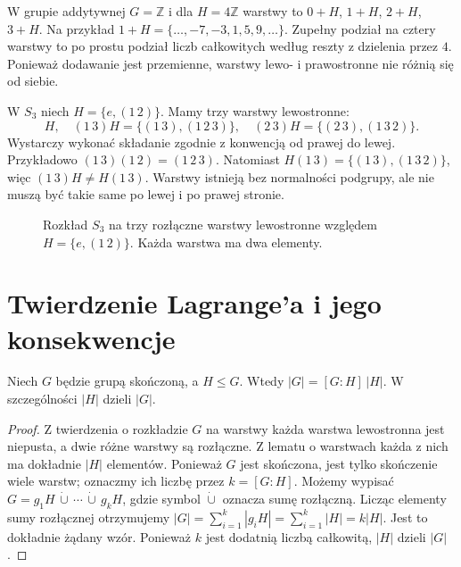 \begin{przyklad}
W grupie addytywnej $G=\mathbb Z$ i dla $H=4\mathbb Z$
warstwy to $0+H$, $1+H$, $2+H$, $3+H$.
Na przykład $1+H=\{\ldots,-7,-3,1,5,9,\ldots\}$.
Zupełny podział na cztery warstwy to po prostu podział liczb
całkowitych według reszty z dzielenia przez $4$.
Ponieważ dodawanie jest przemienne, warstwy lewo- i prawostronne
nie różnią się od siebie.
\end{przyklad}

\begin{przyklad}
\label{aa:prz:warstwy-s3}
W $S_3$ niech $H=\{e,(1\,2)\}$. Mamy trzy warstwy lewostronne:
\[
 H,\quad (1\,3)H=\{(1\,3),(1\,2\,3)\},\quad
 (2\,3)H=\{(2\,3),(1\,3\,2)\}.
\]
Wystarczy wykonać składanie zgodnie z konwencją od prawej do lewej.
Przykładowo $(1\,3)(1\,2)=(1\,2\,3)$.
Natomiast $H(1\,3)=\{(1\,3),(1\,3\,2)\}$,
więc $(1\,3)H\ne H(1\,3)$.
Warstwy istnieją bez normalności podgrupy, ale nie muszą być
takie same po lewej i po prawej stronie.
\end{przyklad}

\begin{figure}[htbp]
\centering
{}
\caption{Rozkład $S_3$ na trzy rozłączne warstwy lewostronne względem
$H=\{e,(1\,2)\}$. Każda warstwa ma dwa elementy.}
\label{aa:fig:warstwy-s3}
\end{figure}

\section{Twierdzenie Lagrange'a i jego konsekwencje}
\begin{twierdzenie}[Lagrange'a]
\label{aa:tw:lagrange}
Niech $G$ będzie grupą skończoną, a $H\le G$. Wtedy
$|G|=[G:H]\,|H|$. W szczególności $|H|$ dzieli $|G|$.
\end{twierdzenie}
\begin{proof}
Z twierdzenia o rozkładzie $G$ na warstwy każda warstwa
lewostronna jest niepusta, a dwie różne warstwy są rozłączne.
Z lematu o warstwach każda z nich ma dokładnie $|H|$ elementów.
Ponieważ $G$ jest skończona, jest tylko skończenie wiele warstw;
oznaczmy ich liczbę przez $k=[G:H]$.
Możemy wypisać $G=g_1H\,\dot\cup\,\cdots\,\dot\cup\,g_kH$,
gdzie symbol $\dot\cup$ oznacza sumę rozłączną.
Licząc elementy sumy rozłącznej otrzymujemy
$|G|=\sum_{i=1}^{k}|g_iH|=\sum_{i=1}^{k}|H|=k|H|$.
Jest to dokładnie żądany wzór. Ponieważ $k$ jest dodatnią
liczbą całkowitą, $|H|$ dzieli $|G|$.
\end{proof}

